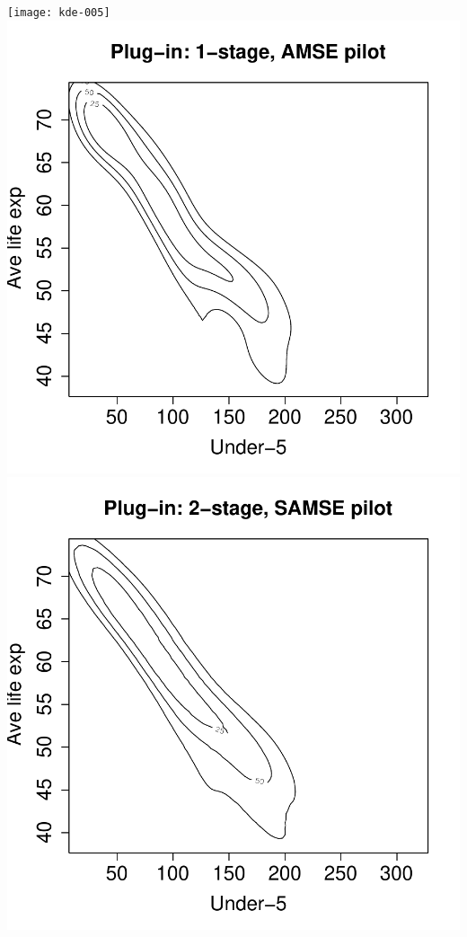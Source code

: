 \documentclass[a4paper,11pt]{article}
\begin{document}
\begin{center}
\texttt{[image: kde-005]}
\includegraphics{kde-006}
\includegraphics{kde-007}

\end{center}
\end{document}
